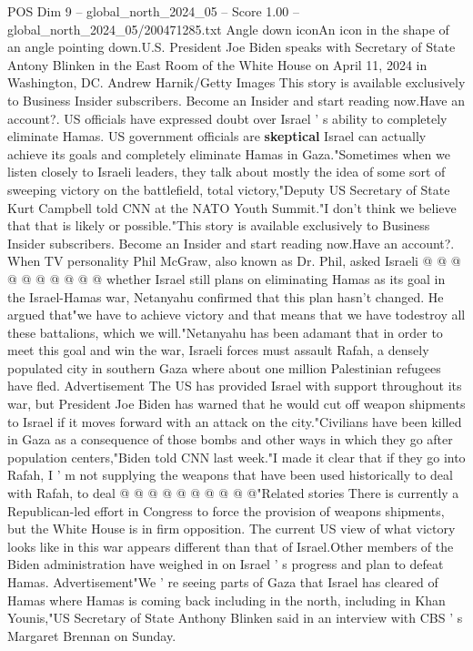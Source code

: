\begin{textsample}{POS Dim 9 – global\_north\_2024\_05 – Score 1.00 – global\_north\_2024\_05/200471285.txt}  \label{ex:f9_pos_213}
Angle down iconAn icon in the shape of an angle pointing down.U.S.
President Joe Biden speaks with Secretary of State Antony Blinken in the East Room of the White House on April 11, 2024 in Washington, DC.
Andrew Harnik/Getty Images This story is available exclusively to Business Insider subscribers.
Become an Insider and start reading now.Have an account?.
US officials have expressed doubt over Israel ' s ability to completely eliminate Hamas.
US government officials are \textbf{skeptical} Israel can actually achieve its goals and completely eliminate Hamas in Gaza."Sometimes when we listen closely to Israeli leaders, they talk about mostly the idea of some sort of sweeping victory on the battlefield, total victory,"Deputy US Secretary of State Kurt Campbell told CNN at the NATO Youth Summit."I don't think we believe that that is likely or possible."This story is available exclusively to Business Insider subscribers.
Become an Insider and start reading now.Have an account?.
When TV personality Phil McGraw, also known as Dr.
Phil, asked Israeli @ @ @ @ @ @ @ @ @ @ whether Israel still plans on eliminating Hamas as its goal in the Israel-Hamas war, Netanyahu confirmed that this plan hasn't changed.
He argued that"we have to achieve victory and that means that we have todestroy all these battalions, which we will."Netanyahu has been adamant that in order to meet this goal and win the war, Israeli forces must assault Rafah, a densely populated city in southern Gaza where about one million Palestinian refugees have fled.
Advertisement The US has provided Israel with support throughout its war, but President Joe Biden has warned that he would cut off weapon shipments to Israel if it moves forward with an attack on the city."Civilians have been killed in Gaza as a consequence of those bombs and other ways in which they go after population centers,"Biden told CNN last week."I made it clear that if they go into Rafah, I ' m not supplying the weapons that have been used historically to deal with Rafah, to deal @ @ @ @ @ @ @ @ @ @"Related stories There is currently a Republican-led effort in Congress to force the provision of weapons shipments, but the White House is in firm opposition.
The current US view of what victory looks like in this war appears different than that of Israel.Other members of the Biden administration have weighed in on Israel ' s progress and plan to defeat Hamas.
Advertisement"We ' re seeing parts of Gaza that Israel has cleared of Hamas where Hamas is coming back including in the north, including in Khan Younis,"US Secretary of State Anthony Blinken said in an interview with CBS ' s Margaret Brennan on Sunday.

\end{textsample}
